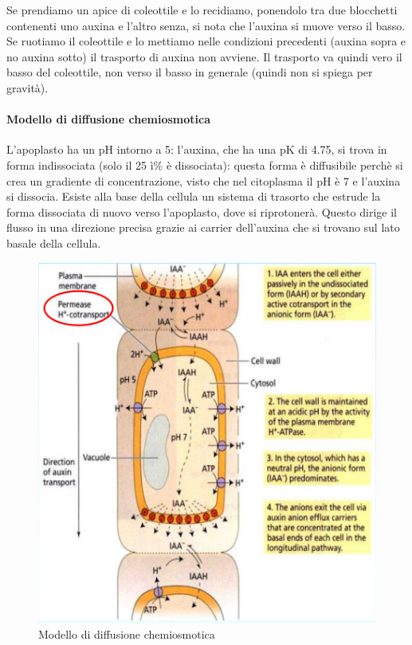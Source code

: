 \documentclass[a4paper,12pt]{book}
\begin{document}
Se prendiamo un apice di coleottile e lo recidiamo, ponendolo tra due blocchetti contenenti uno auxina e l'altro senza, si nota che l'auxina si muove verso il basso. Se ruotiamo il coleottile e lo mettiamo nelle condizioni precedenti (auxina sopra e no auxina sotto) il trasporto di auxina non avviene. Il trasporto va quindi vero il basso del coleottile, non verso il basso in generale (quindi non si spiega per gravità).

\paragraph{Modello di diffusione chemiosmotica} L'apoplasto ha un pH intorno a 5:  l'auxina, che ha una pK di 4.75, si trova in forma indissociata (solo il 25 ì\% è dissociata): questa forma è diffusibile perchè si crea un gradiente di concentrazione, visto che nel citoplasma il pH è 7 e l'auxina si dissocia. Esiste alla base della cellula un sistema di trasorto che estrude la forma dissociata di nuovo verso l'apoplasto, dove si riprotonerà. Questo dirige il flusso in una direzione precisa grazie ai carrier dell'auxina che si trovano sul lato basale della cellula.
\begin{figure}[H]
\centering
\includegraphics[scale=0.4]{immagini/chemio.jpg}
\caption{Modello di diffusione chemiosmotica}
\end{figure}
\end{document}
